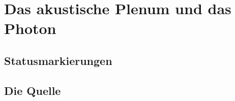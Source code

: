 
\providecommand{\BM}{\textbf{[B]}}
\providecommand{\KM}{\textbf{[K]}}
\providecommand{\SM}{\textbf{[S]}}
\providecommand{\XM}{\textbf{[X]}}
\providecommand{\QM}{\textbf{[Q]}}

\chapter*{Das akustische Plenum und das Photon}

\begin{abstract}
C.~C.~Lien (Zenodo, DOI 10.5281/zenodo.21800087, 8.~September 2026) deutet den
Raum als kompressibles Superfluid, leitet die Elektronmasse aus der
Temperatur des kosmischen Mikrowellenhintergrunds ab, übernimmt für Myon und
Tau eine Massenformel, setzt die Neutrinomasse mit $k_BT_\text{CMB}$ gleich und
beschreibt das Photon als longitudinale Schockwelle mit transversaler
Nachwelle. Dieses Dokument prüft die Arbeit als Fallstudie mit einem
Prüfskript (20/20). Die Zahlenangaben sind reproduzierbar \KM. Keine der
tragenden Aussagen hält der Prüfung stand: der Elektronentreffer liegt
88~Standardabweichungen neben dem Messwert und ist im Nulltest nicht
signifikant, die Leptonformel ist bekannt, die Neutrinomasse ist mit der
Oszillation unverträglich, die Rotverschiebung wäre frequenzabhängig, und
das Photon hätte drei statt zwei Polarisationen \XM. Die Gegenprobe zeigt,
wie die FFGFT an denselben Stellen verfährt, ohne deren Inhalte zu
wiederholen.
\end{abstract}

\section*{Statusmarkierungen}


\section{Die Quelle}

